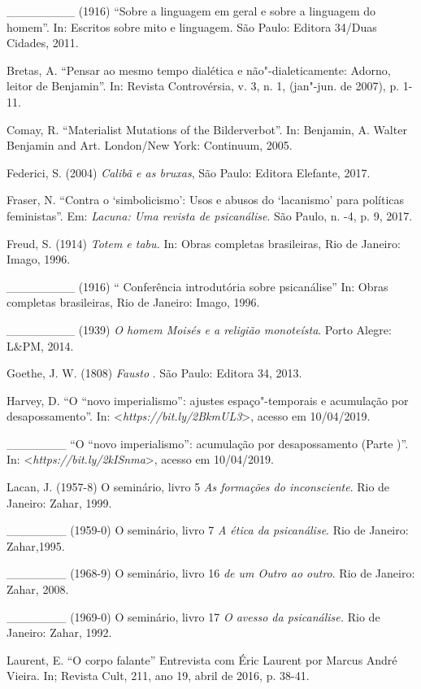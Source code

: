 \_\_\_\_\_\_\_\_ (1916) ``Sobre a linguagem em geral e sobre a linguagem
do homem''. In: Escritos sobre mito e linguagem. São Paulo: Editora
34/Duas Cidades, 2011.

Bretas, A. ``Pensar ao mesmo tempo dialética e não"-dialeticamente:
Adorno, leitor de Benjamin''. In: Revista Controvérsia, v. 3, n. 1,
(jan"-jun. de 2007), p. 1-11.

Comay, R. ``Materialist Mutations of the Bilderverbot''. In: Benjamin,
A. Walter Benjamin and Art. London/New York: Continuum, 2005.

Federici, S. (2004) \emph{Calibã e as bruxas}, São Paulo: Editora
Elefante, 2017.

Fraser, N. ``Contra o `simbolicismo': Usos e abusos do `lacanismo' para
políticas feministas''. Em: \emph{Lacuna: Uma revista de psicanálise}.
São Paulo, n. -4, p. 9, 2017.

Freud, S. (1914) \emph{Totem e tabu.} In: Obras completas brasileiras,
Rio de Janeiro: Imago, 1996.

\_\_\_\_\_\_\_\_ (1916) `` Conferência introdutória sobre psicanálise''
In: Obras completas brasileiras, Rio de Janeiro: Imago, 1996.

\_\_\_\_\_\_\_\_ (1939) \emph{O homem Moisés e a religião monoteísta}.
Porto Alegre: L\&PM, 2014.

Goethe, J. W. (1808) \emph{Fausto }. São Paulo: Editora 34, 2013.

Harvey, D. ``O ``novo imperialismo'': ajustes espaço"-temporais e
acumulação por desapossamento''. In:
\textless{}\emph{https://bit.ly/2BkmUL3}\textgreater{},
acesso em 10/04/2019.

\_\_\_\_\_\_\_ ``O ``novo imperialismo'': acumulação por desapossamento
(Parte )''. In:
\textless{}\emph{https://bit.ly/2kISnma}\textgreater{},
acesso em 10/04/2019.

Lacan, J. (1957-8) O seminário, livro 5 \emph{As formações do
inconsciente}. Rio de Janeiro: Zahar, 1999.

\_\_\_\_\_\_\_ (1959-0) O seminário, livro 7 \emph{A ética da
psicanálise}. Rio de Janeiro: Zahar,1995.

\_\_\_\_\_\_\_ (1968-9) O seminário, livro 16 \emph{de um Outro ao
outro}. Rio de Janeiro: Zahar, 2008.

\_\_\_\_\_\_\_ (1969-0) O seminário, livro 17 \emph{O avesso da
psicanálise.} Rio de Janeiro: Zahar, 1992.

Laurent, E. ``O corpo falante'' Entrevista com Éric Laurent por Marcus
André Vieira. In; Revista Cult, 211, ano 19, abril de 2016, p. 38-41.

